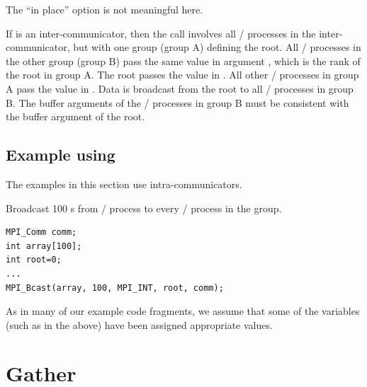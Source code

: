 The ``in place'' option is not meaningful here.

If  is an inter-communicator, then the call involves all
\MPI/ processes in the inter-communicator, but with one group (group A) defining the
root.  All \MPI/ processes in the other group (group B) pass the same value
in argument
, which is the rank of the root in group A.  The root
passes the value  in .
All other \MPI/ processes in group A pass the value  in
.
Data is broadcast from the root to all \MPI/ processes in group B.
The
buffer arguments of the \MPI/ processes in group B must be consistent with
the buffer argument of the root.

\subsection{Example using \texorpdfstring{}{MPI\_BCAST}}

The examples in this section use intra-communicators.

\begin{example}
\label{coll-exZ}
%
Broadcast 100 s from \MPI/ process  to every \MPI/ process in the group.

\begin{lstlisting}[language={[MPI]C}]
MPI_Comm comm;
int array[100];
int root=0;
...
MPI_Bcast(array, 100, MPI_INT, root, comm);
\end{lstlisting}
As in many of our example code fragments, we assume that some
of the variables (such as  in the above) have been assigned
appropriate values.
\end{example}

\section{Gather}
\label{sec:coll-gather}


